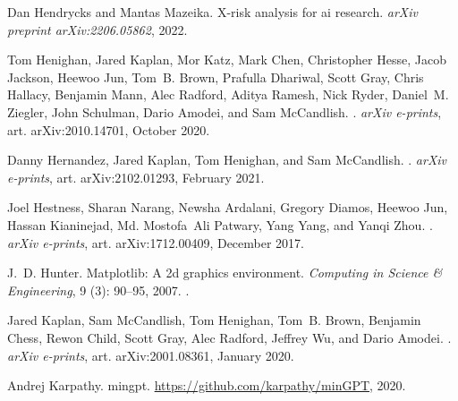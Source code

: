 \documentclass{article} %
\begin{document}
\begin{thebibliography}{44}
Dan Hendrycks and Mantas Mazeika.
\newblock X-risk analysis for ai research.
\newblock \emph{arXiv preprint arXiv:2206.05862}, 2022.

Tom {Henighan}, Jared {Kaplan}, Mor {Katz}, Mark {Chen}, Christopher {Hesse},
  Jacob {Jackson}, Heewoo {Jun}, Tom~B. {Brown}, Prafulla {Dhariwal}, Scott
  {Gray}, Chris {Hallacy}, Benjamin {Mann}, Alec {Radford}, Aditya {Ramesh},
  Nick {Ryder}, Daniel~M. {Ziegler}, John {Schulman}, Dario {Amodei}, and Sam
  {McCandlish}.
.
\newblock \emph{arXiv e-prints}, art. arXiv:2010.14701, October 2020.

Danny {Hernandez}, Jared {Kaplan}, Tom {Henighan}, and Sam {McCandlish}.
.
\newblock \emph{arXiv e-prints}, art. arXiv:2102.01293, February 2021.

Joel {Hestness}, Sharan {Narang}, Newsha {Ardalani}, Gregory {Diamos}, Heewoo
  {Jun}, Hassan {Kianinejad}, Md. Mostofa~Ali {Patwary}, Yang {Yang}, and Yanqi
  {Zhou}.
.
\newblock \emph{arXiv e-prints}, art. arXiv:1712.00409, December 2017.

J.~D. Hunter.
\newblock Matplotlib: A 2d graphics environment.
\newblock \emph{Computing in Science \& Engineering}, 9 (3):
  90--95, 2007.
\newblock {}.

Jared {Kaplan}, Sam {McCandlish}, Tom {Henighan}, Tom~B. {Brown}, Benjamin
  {Chess}, Rewon {Child}, Scott {Gray}, Alec {Radford}, Jeffrey {Wu}, and Dario
  {Amodei}.
.
\newblock \emph{arXiv e-prints}, art. arXiv:2001.08361, January 2020.

Andrej Karpathy.
\newblock mingpt.
\newblock \url{https://github.com/karpathy/minGPT}, 2020.


\end{thebibliography}
\end{document}
